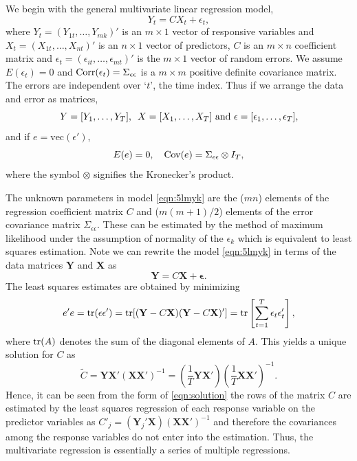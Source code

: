 We begin with the general multivariate linear regression model,
	\begin{equation} \label{eqn:5lmyk}
	Y_t = C X_t + \epsilon_t,
	\end{equation}
where $Y_t= (Y_{1t}, \ldots,Y_{mk})'$ is an $m \times 1$ vector of responsive variables and $X_t= (X_{1t}, \ldots, X_{nt})'$ is an $n \times 1$ vector of predictors, $C$ is an $m \times n$ coefficient matrix and $\epsilon_t= (\epsilon_{it}, \ldots, \epsilon_{mt})'$ is the $m \times 1$ vector of random errors. We assume $E(\epsilon_t)= 0$ and $\operatorname{Corr}(\epsilon_t)= \Sigma_{\epsilon \epsilon}$ is a $m \times m$ positive definite covariance matrix. The errors are independent over `$t$', the time index. Thus if we arrange the data and error as matrices,
	\begin{equation} \label{eqn:5yyt}
	Y= [Y_1,\ldots,Y_T], \enskip X=[X_1,\ldots,X_T] \text{ and } \epsilon= [\epsilon_1, \ldots,\epsilon_T],
	\end{equation}
and if $e=\text{vec}(\epsilon')$,
	\begin{equation} \label{eqn:5Ee0}
	E(e)=0, \quad \cov(e)= \Sigma_{\epsilon \epsilon} \otimes I_T,
	\end{equation}
where the symbol $\otimes$ signifies the Kronecker's product. 


The unknown parameters in model \eqref{eqn:5lmyk} are the ($mn$) elements of the regression coefficient matrix $C$ and ($m(m+1)/2$) elements of the error covariance matrix $\Sigma_{\epsilon \epsilon}$. These can be estimated by the method of maximum likelihood under the assumption of normality of the $\epsilon_k$ which is equivalent to least squares estimation. Note we can rewrite the model \eqref{eqn:5lmyk} in terms of the data matrices $\mathbf{Y}$ and $\mathbf{X}$ as
	\begin{equation} \label{eqn:rewrite}
	\mathbf{Y} = C \mathbf{X} + \mathbf{\epsilon}.
	\end{equation}
The least squares estimates are obtained by minimizing
	\begin{equation} \label{eqn:minimize}
	e'e= \tr (\epsilon\epsilon')= \tr [(\mathbf{Y} - C\mathbf{X}) (\mathbf{Y} - C \mathbf{X})']= \tr \left[\sum_{t=1}^T \epsilon_t \epsilon_t' \right],
	\end{equation}
where $\operatorname{tr}(A)$ denotes the sum of the diagonal elements of $A$. This yields a unique solution for $C$ as
	\begin{equation} \label{eqn:solution}
	\tilde{C}= \mathbf{Y} \mathbf{X}' (\mathbf{X} \mathbf{X}')^{-1} = \left( \dfrac{1}{T} \mathbf{Y}\mathbf{X}' \right) \left( \dfrac{1}{T} \mathbf{X} \mathbf{X}' \right)^{-1}.
	\end{equation}
Hence, it can be seen from the form of \eqref{eqn:solution} the rows of the matrix $C$ are estimated by the least squares regression of each response variable on the predictor variables as $C'_j= (\mathbf{Y}_j' \mathbf{X})(\mathbf{X}\mathbf{X}')^{-1}$ and therefore the covariances among the response variables do not enter into the estimation. Thus, the multivariate regression is essentially a series of multiple regressions. 


